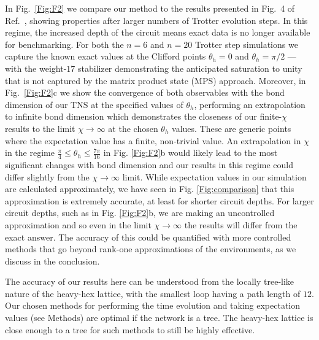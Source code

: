 \documentclass[%
 superscriptaddress,
 amsmath,amssymb,
 prx,
]{revtex4-2}
\begin{document}
\par In Fig.~\ref{Fig:F2} we compare our method to the results presented in Fig.~4 of Ref.~\cite{kim2023}, showing properties after 
larger numbers of Trotter evolution steps. 
In this regime, the increased depth of the circuit means exact data is no longer available for benchmarking. For both the $n = 6$ and $n = 20$ Trotter step simulations we capture the known exact values at the Clifford points $\theta_{h} = 0$ and $\theta_{h} = \pi/2$ --- with the weight-$17$ stabilizer demonstrating the anticipated saturation to unity that is not captured by the matrix product state (MPS) approach. 
Moreover, in Fig.~\ref{Fig:F2}c we show the convergence of both observables with the bond dimension of our TNS at the specified values of $\theta_{h}$, performing an extrapolation to infinite bond dimension which demonstrates the closeness of our finite-$\chi$ results to the limit $\chi \rightarrow \infty$ at the chosen $\theta_{h}$ values. These are generic points where the expectation value has a finite, non-trivial value.
An extrapolation in $\chi$ in the regime $\frac{\pi}{4} \leq \theta_{h} \leq \frac{7\pi}{16}$ in Fig. \ref{Fig:F2}b would likely lead to the most significant changes with bond dimension and our results in this regime could differ slightly from the $\chi \rightarrow \infty$ limit.
While expectation values in our simulation are calculated approximately, we have seen in Fig. \ref{Fig:comparison} that this approximation is extremely accurate, at least for shorter circuit depths. For larger circuit depths, such as in Fig. \ref{Fig:F2}b,  we are making an uncontrolled approximation and so even in the limit $\chi \rightarrow \infty$ the results will differ from the exact answer. The accuracy of this could be quantified with more controlled methods that go beyond rank-one approximations of the environments, as we discuss in the conclusion.

\par The accuracy of our results here can be understood from the locally tree-like nature of the heavy-hex lattice, with the smallest loop having a path length of $12$. Our chosen methods for performing the time evolution and taking expectation values (see Methods) are optimal if the network is a tree. The heavy-hex lattice is close enough to a tree for such methods to still be highly effective. 
\end{document}
